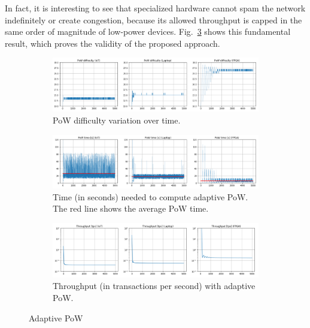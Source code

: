 \documentclass[../main.tex]{subfiles}
\begin{document}
In fact, it is interesting to see that specialized hardware cannot spam the network indefinitely or create congestion, because its allowed throughput is capped in the same order of magnitude of low-power devices. Fig.~\ref{fig:tps_adaptive} shows this fundamental result, which proves the validity of the proposed approach.

\begin{figure}
    \centering
    \begin{subfigure}[b]{\textwidth}
        \includegraphics[width=\linewidth]{images/dif_adaptive.PNG}
        \caption{PoW difficulty variation over time.}
        \label{fig:dif_adaptive}
    \end{subfigure}
    
    \begin{subfigure}[b]{\textwidth}
        \includegraphics[width=\linewidth]{images/time_adaptive.PNG}
        \caption{Time (in seconds) needed to compute adaptive PoW. The red line shows the average PoW time.}
        \label{fig:time_adaptive}
    \end{subfigure}
    
    \begin{subfigure}[b]{\textwidth}
        \includegraphics[width=\linewidth]{images/tps_adaptive.PNG}
        \caption{Throughput (in transactions per second) with adaptive PoW.}
        \label{fig:tps_adaptive}
    \end{subfigure}
    \caption{Adaptive PoW}\label{fig:adaptive}
\end{figure}
\end{document}

